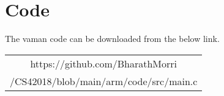 \documentclass[a4paper,11pt,twocolumn]{article}
\begin{document}
\section{Code}
	The vaman code can be downloaded from the below link.
\begin{table}[h]
	\centering
	\begin{tabular}{|c|}
		\hline
                 https://github.com/BharathMorri\\
		 /CS42018/blob/main/arm/code/src/main.c\\         
		 \hline
	\end{tabular}
\end{table}
\end{document}
